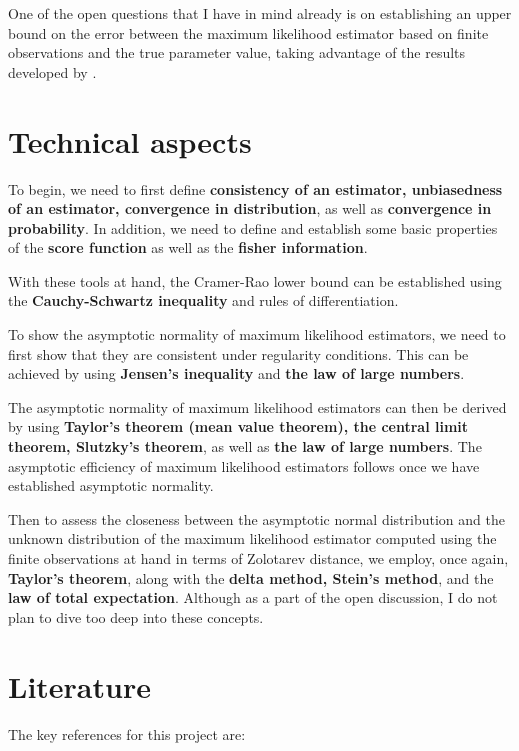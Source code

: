 \documentclass[]{STAT_547C}
\begin{document}
One of the open questions that I have in mind already is on establishing an upper bound on the error between the maximum likelihood estimator based on finite observations and the true parameter value, taking advantage of the results developed by \cite{anastasiou2015bounds}.

\section{Technical aspects}

To begin, we need to first define \textbf{consistency of an estimator, unbiasedness of an estimator, convergence in distribution}, as well as \textbf{convergence in probability}. In addition, we need to define and establish some basic properties of the \textbf{score function} as well as the \textbf{fisher information}.

With these tools at hand, the Cramer-Rao lower bound can be established using the \textbf{Cauchy-Schwartz inequality} and rules of differentiation.

To show the asymptotic normality of maximum likelihood estimators, we need to first show that they are consistent under regularity conditions. This can be achieved by using \textbf{Jensen's inequality} and \textbf{the law of large numbers}.

The asymptotic normality of maximum likelihood estimators can then be derived by using \textbf{Taylor's theorem (mean value theorem), the central limit theorem, Slutzky's theorem}, as well as \textbf{the law of large numbers}. The asymptotic efficiency of maximum likelihood estimators follows once we have established asymptotic normality.

Then to assess the closeness between the asymptotic normal distribution and the unknown distribution of the maximum likelihood estimator computed using the finite observations at hand in terms of Zolotarev distance, we employ, once again, \textbf{Taylor's theorem}, along with the \textbf{delta method, Stein's method}, and the \textbf{law of total expectation}. Although as a part of the open discussion, I do not plan to dive too deep into these concepts.

\section{Literature}

The key references for this project are:
\end{document}
